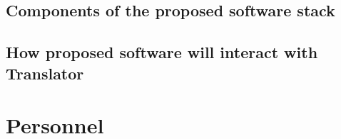 \documentclass[11pt,notitlepage]{article}
\begin{document}
\subsection{Components of the proposed software stack}



\subsection{How proposed software will interact with Translator}



\section{Personnel}



\end{document}
